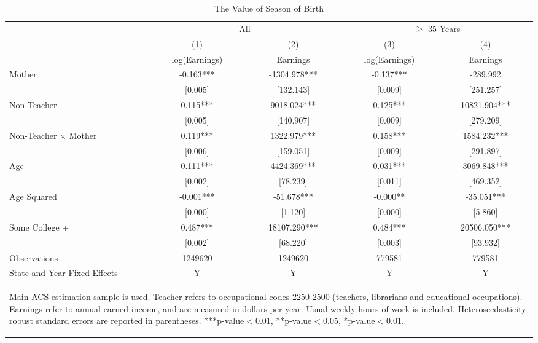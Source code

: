 \documentclass[a4paper, 12 pt]{article}
\theoremstyle{plain}
\begin{document}
\begin{doublespace}
\begin{table}[htbp]\centering
\def\sym#1{\ifmmode^{#1}\else\(^{#1}\)\fi}
\caption{The Value of Season of Birth \label{tab:IPUMSWages}}
\begin{tabular}{l*{4}{c}}
\toprule
                    &\multicolumn{2}{c}{All}        &\multicolumn{2}{c}{$\geq$ 35 Years}\\\cmidrule(lr){2-3}\cmidrule(lr){4-5}
                    &\multicolumn{1}{c}{(1)}   &\multicolumn{1}{c}{(2)}   &\multicolumn{1}{c}{(3)}   &\multicolumn{1}{c}{(4)}   \\
                    &log(Earnings)   &    Earnings   &log(Earnings)   &    Earnings   \\
\midrule
Mother              &      -0.163***&   -1304.978***&      -0.137***&    -289.992   \\
                    &     [0.005]   &   [132.143]   &     [0.009]   &   [251.257]   \\
Non-Teacher         &       0.115***&    9018.024***&       0.125***&   10821.904***\\
                    &     [0.005]   &   [140.907]   &     [0.009]   &   [279.209]   \\
Non-Teacher $\times$ Mother&       0.119***&    1322.979***&       0.158***&    1584.232***\\
                    &     [0.006]   &   [159.051]   &     [0.009]   &   [291.897]   \\
Age                 &       0.111***&    4424.369***&       0.031***&    3069.848***\\
                    &     [0.002]   &    [78.239]   &     [0.011]   &   [469.352]   \\
Age Squared         &      -0.001***&     -51.678***&      -0.000** &     -35.051***\\
                    &     [0.000]   &     [1.120]   &     [0.000]   &     [5.860]   \\
Some College +      &       0.487***&   18107.290***&       0.484***&   20506.050***\\
                    &     [0.002]   &    [68.220]   &     [0.003]   &    [93.932]   \\
\midrule
Observations        &     1249620   &     1249620   &      779581   &      779581   \\
State and Year Fixed Effects & Y & Y & Y & Y \\
\bottomrule\multicolumn{5}{p{15cm}}{\begin{footnotesize}  Main ACS estimation sample is used.  Teacher refers to occupational codes 2250-2500 (teachers, librarians and educational occupations).  Earnings refer to annual earned income, and are measured in dollars per year. Usual weekly hours of work is included. Heteroscedasticity robust standard errors are reported in parentheses. ***p-value$<$0.01, **p-value$<$0.05, *p-value$<$0.01.
\end{footnotesize}}\end{tabular}\end{table}




\end{doublespace}
\end{document}
